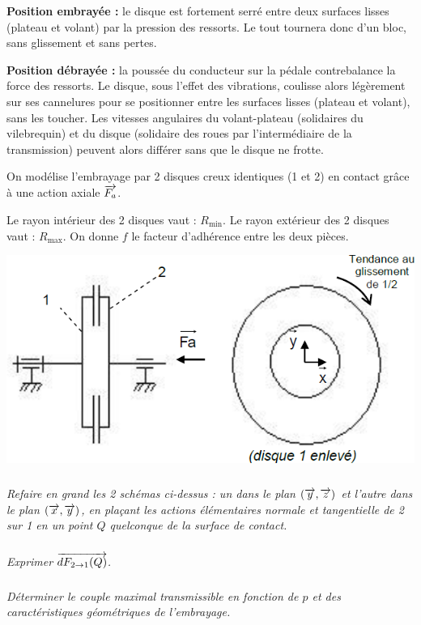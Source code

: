 \documentclass[10pt,fleqn]{article} %
\begin{document}
\begin{multicols}{2}
\textbf{Position embrayée :} le disque est fortement serré entre deux surfaces lisses (plateau et volant) par la 
pression des ressorts. Le tout tournera donc d'un bloc, sans glissement et sans pertes. 

\textbf{Position débrayée :} la poussée du conducteur sur la pédale contrebalance la force des ressorts. Le disque, sous l'effet des vibrations, coulisse alors légèrement sur ses cannelures pour se positionner entre les surfaces lisses (plateau et volant), sans les toucher. Les vitesses angulaires du volant-plateau (solidaires du vilebrequin) et du disque (solidaire des roues par l'intermédiaire de la transmission) peuvent alors différer 
sans que le disque ne frotte. 


On modélise l'embrayage par 2 disques creux identiques (1 et 2) en contact grâce à une 
action axiale $\overrightarrow{F_a}$. 
 
Le rayon intérieur des 2 disques vaut : $R_{\text{min}}$. 
Le rayon extérieur des 2 disques vaut : $R_{\text{max}}$. 
On donne $f$ le facteur d’adhérence entre les deux pièces. 



\begin{center}
\includegraphics[width=\linewidth]{images/fig_07}
\end{center}

\subparagraph{}
\textit{Refaire en grand les 2 schémas ci-dessus : un dans le plan $(\overrightarrow{y}, \overrightarrow{z})$ et l’autre dans le plan $(\overrightarrow{x}, \overrightarrow{y})$, en plaçant les actions élémentaires normale et tangentielle de 2 sur 1 en un point $Q$ quelconque de la surface de contact.}

\subparagraph{}
\textit{Exprimer $\overrightarrow{dF_{2\rightarrow 1}(Q)}$.}

\subparagraph{}
\textit{Déterminer le couple maximal transmissible en fonction de $p$ et des caractéristiques 
géométriques de l’embrayage.}


\end{multicols}
\end{document}
